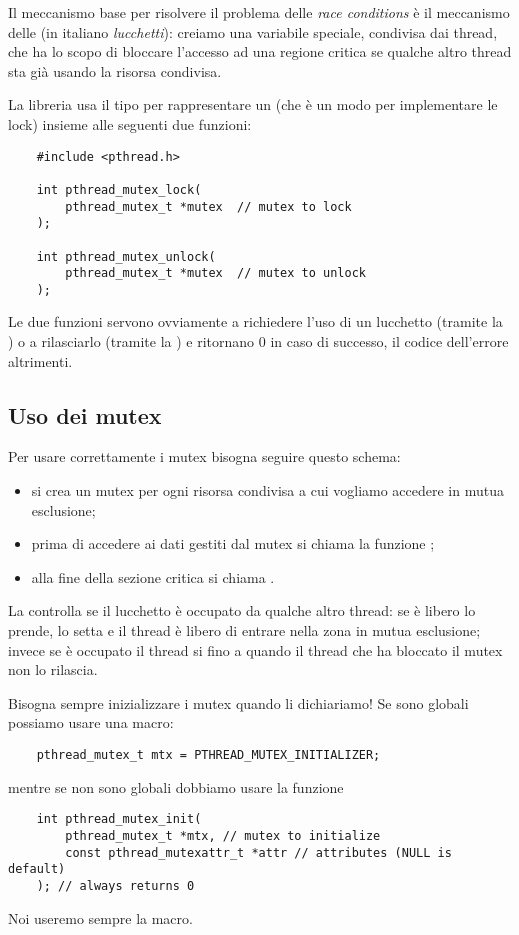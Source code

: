 Il meccanismo base per risolvere il problema delle \emph{race conditions} è il meccanismo delle  (in italiano \emph{lucchetti}): creiamo una variabile speciale, condivisa dai thread, che ha lo scopo di bloccare l'accesso ad una regione critica se qualche altro thread sta già usando la risorsa condivisa.

La libreria  usa il tipo  per rappresentare un  (che è un modo per implementare le lock) insieme alle seguenti due funzioni: 
\begin{verbatim}
    #include <pthread.h>

    int pthread_mutex_lock(
        pthread_mutex_t *mutex  // mutex to lock
    );

    int pthread_mutex_unlock(
        pthread_mutex_t *mutex  // mutex to unlock
    );
\end{verbatim}

Le due funzioni servono ovviamente a richiedere l'uso di un lucchetto (tramite la ) o a rilasciarlo (tramite la ) e ritornano $0$ in caso di successo, il codice dell'errore altrimenti.

\subsection{Uso dei mutex}

Per usare correttamente i mutex bisogna seguire questo schema:
\begin{itemize}
    \item si crea un mutex per ogni risorsa condivisa a cui vogliamo accedere in mutua esclusione;
    \item prima di accedere ai dati gestiti dal mutex  si chiama la funzione ;
    \item alla fine della sezione critica si chiama . 
\end{itemize} La  controlla se il lucchetto è occupato da qualche altro thread: se è libero lo prende, lo setta e il thread è libero di entrare nella zona in mutua esclusione; invece se è occupato il thread si  fino a quando il thread che ha bloccato il mutex non lo rilascia.

 Bisogna sempre inizializzare i mutex quando li dichiariamo! Se sono globali possiamo usare una macro: 
\begin{verbatim}
    pthread_mutex_t mtx = PTHREAD_MUTEX_INITIALIZER;
\end{verbatim}
mentre se non sono globali dobbiamo usare la funzione 
\begin{verbatim}
    int pthread_mutex_init(
        pthread_mutex_t *mtx, // mutex to initialize
        const pthread_mutexattr_t *attr // attributes (NULL is default)
    ); // always returns 0
\end{verbatim}
Noi useremo sempre la macro.


